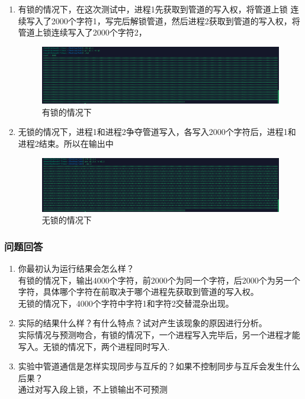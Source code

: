 \documentclass{article}
\begin{document}
    \begin{enumerate}
        \item 有锁的情况下，在这次测试中，进程1先获取到管道的写入权，将管道上锁
        连续写入了2000个字符1，写完后解锁管道，然后进程2获取到管道的写入权，将管道上锁连续写入了2000个字符2，
        \begin{figure}[htbp]
            \centering
            \includegraphics[scale=0.9]{picture/15.png}
            \caption{有锁的情况下}
            \label{15}
        \end{figure}
        \item 无锁的情况下，进程1和进程2争夺管道写入，各写入2000个字符后，进程1和进程2结束。所以在输出中
        \begin{figure}[htbp]
            \centering
            \includegraphics[scale=0.9]{picture/16.png}
            \caption{无锁的情况下}
            \label{16}
        \end{figure}
    \end{enumerate}

    \subsubsection{问题回答}

    \begin{enumerate}
        \item 你最初认为运行结果会怎么样？\\
        有锁的情况下，输出4000个字符，前2000个为同一个字符，后2000个为另一个字符，具体哪个字符在前取决于哪个进程先获取到管道的写入权。\\
        无锁的情况下，4000个字符中字符1和字符2交替混杂出现。
        \item 实际的结果什么样？有什么特点？试对产生该现象的原因进行分析。\\
        实际情况与预测吻合，有锁的情况下，一个进程写入完毕后，另一个进程才能写入。无锁的情况下，两个进程同时写入.
        \item 实验中管道通信是怎样实现同步与互斥的？如果不控制同步与互斥会发生什么后果？\\
        通过对写入段上锁，不上锁输出不可预测
    \end{enumerate}
\end{document}

